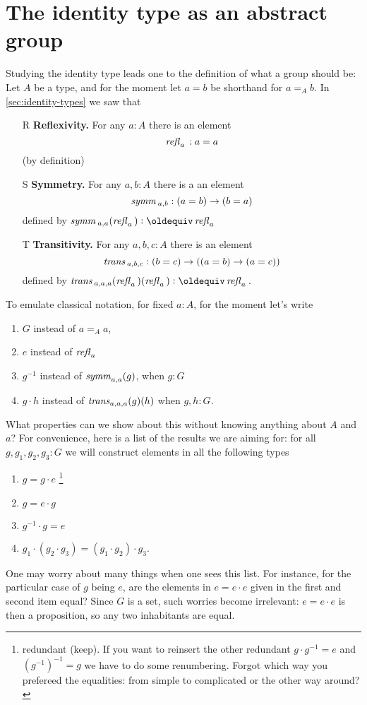 \section{The identity type as an abstract group }
\label{sec:identity-type-as-abstract}

Studying the identity type leads one to the definition of what a group should be:
Let $A$ be a type, and for the moment let $a=b$ be shorthand for $a=_Ab$.  In \cref{sec:identity-types} we saw that
\begin{enumerate}
\item[R] {\bf Reflexivity.} For any $a:A$ there is an element
$$\mathop{{\it refl}_{a}}{}:a=a$$ (by definition)
\item[S] {\bf Symmetry.} For any $a,b:A$ there is a an element $$\mathop{\mathit{symm}}{}_{a,b}:(a=b)\to (b=a)$$ defined by $\symm{}_{a,a}(\refl a{})\defequi\refl a{}$
\item[T] {\bf Transitivity.} For any $a,b,c:A$ there is an element $$\mathop{\mathit{trans}}{}_{a,b,c}:(b=c)\to((a=b)\to(a=c))$$ defined by $\trans{}_{a,a,a}(\refl a{})(\refl a{})\defequi \refl a{}$.
\end{enumerate}

 To emulate classical notation, for fixed $a:A$,  for the moment let's write
 \begin{enumerate}
 \item $G$ instead of $a=_Aa$,
 \item $e$ instead of $\mathop{{\it refl}_{a}}{}$
 \item $g^{-1}$ instead of $\mathop{\mathit{symm}}_{a,a}(g)$, when $g:G$
 \item $g\cdot h$ instead of $\mathop{\mathit{trans}}_{a,a,a}(g)(h)$ when $g,h:G$.
 \end{enumerate}
 What properties can we show about this without knowing anything about $A$ and $a$? For convenience, here is a list of the results we are aiming for: for all $g,g_1,g_2,g_3:G$ we will construct elements in all the following types
 \begin{enumerate}
 \item $g=g\cdot e$ \footnote{redundant (keep).  If you want to reinsert the other redundant $g\cdot g^{-1}=e$ and $(g^{-1})^{-1}=g$ we have to do some renumbering.  Forgot which way you prefereed the equalities: from simple to complicated or the other way around?}
 \item $g=e\cdot g$
 \item $g^{-1}\cdot g=e$
 \item $g_1\cdot(g_2\cdot g_3)=(g_1\cdot g_2)\cdot g_3$.
 \end{enumerate}
 \begin{remark}
   One may worry about many things when one sees this list.  For instance, for the particular case of $g$ being $e$, are the elements in $e=e\cdot e$ given in the first and second item equal?  Since $G$ is a set, such worries become irrelevant: $e=e\cdot e$ is then a proposition, so any two inhabitants are equal.
 \end{remark}


